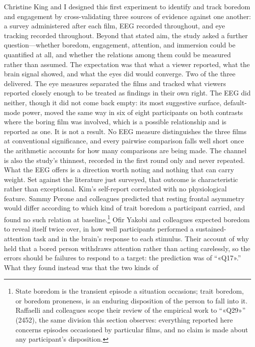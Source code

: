 Christine King and I designed this first experiment to identify and track boredom and
engagement by cross-validating three sources of evidence against one another: a survey
administered after each film, EEG recorded throughout, and eye tracking recorded throughout.
Beyond that stated aim, the study asked a further question---whether boredom, engagement,
attention, and immersion could be quantified at all, and whether the relations among them
could be measured rather than assumed. The expectation was that what a viewer reported, what
the brain signal showed, and what the eyes did would converge. Two of the three delivered. The eye measures separated the films and
tracked what viewers reported closely enough to be treated as findings in their own right. The
EEG did neither, though it did not come back empty: its most suggestive surface, default-mode
power, moved the same way in six of eight participants on both contrasts where the boring film
was involved, which is a possible relationship and is reported as one. It is not a result. No
EEG measure distinguishes the three films at conventional significance, and every pairwise
comparison falls well short once the arithmetic accounts for how many comparisons are being
made. The channel is also the study's thinnest, recorded in the first round only and never
repeated. What the EEG offers is a direction worth noting and nothing that can carry weight.
Set against the literature just surveyed, that outcome is characteristic rather than
exceptional. Kim's self-report correlated with no
physiological feature. Sammy
Perone and colleagues predicted that resting frontal asymmetry would differ according to which
kind of trait boredom a participant carried, and found no such relation at baseline.\footnote{
State boredom is the transient episode a situation occasions; trait boredom, or boredom
proneness, is an enduring disposition of the person to fall into it. Raffaelli and colleagues
scope their review of the empirical work to ``«Q29»'' (2452), the same division this section
observes: everything reported here concerns episodes occasioned by particular films, and no
claim is made about any participant's disposition.} Ofir Yakobi and colleagues expected boredom
to reveal itself twice over, in how well participants performed a sustained-attention task and
in the brain's response to each stimulus. Their account of why held that a bored person
withdraws attention rather than acting carelessly, so the errors should be failures to respond
to a target: the prediction was of ``«Q17».'' What they found instead was that the two kinds of
